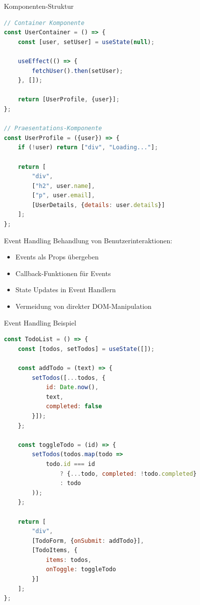 \begin{KR}{Komponenten-Struktur}
\begin{lstlisting}[language=JavaScript, style=basesmol]
// Container Komponente
const UserContainer = () => {
    const [user, setUser] = useState(null);
    
    useEffect(() => {
        fetchUser().then(setUser);
    }, []);
    
    return [UserProfile, {user}];
};

// Praesentations-Komponente
const UserProfile = ({user}) => {
    if (!user) return ["div", "Loading..."];
    
    return [
        "div",
        ["h2", user.name],
        ["p", user.email],
        [UserDetails, {details: user.details}]
    ];
};
\end{lstlisting}
\end{KR}

\begin{concept}{Event Handling}
    Behandlung von Benutzerinteraktionen:
    \begin{itemize}
        \item Events als Props übergeben
        \item Callback-Funktionen für Events
        \item State Updates in Event Handlern
        \item Vermeidung von direkter DOM-Manipulation
    \end{itemize}
\end{concept}

\begin{KR}{Event Handling Beispiel}
\begin{lstlisting}[language=JavaScript, style=basesmol]
const TodoList = () => {
    const [todos, setTodos] = useState([]);
    
    const addTodo = (text) => {
        setTodos([...todos, {
            id: Date.now(),
            text,
            completed: false
        }]);
    };
    
    const toggleTodo = (id) => {
        setTodos(todos.map(todo =>
            todo.id === id
                ? {...todo, completed: !todo.completed}
                : todo
        ));
    };
    
    return [
        "div",
        [TodoForm, {onSubmit: addTodo}],
        [TodoItems, {
            items: todos,
            onToggle: toggleTodo
        }]
    ];
};
\end{lstlisting}
\end{KR}

